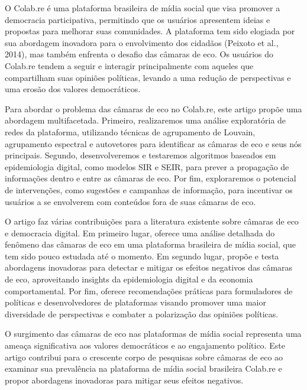 O Colab.re é uma plataforma brasileira de mídia social que visa promover a democracia participativa, permitindo que os usuários apresentem ideias e propostas para melhorar suas comunidades. A plataforma tem sido elogiada por sua abordagem inovadora para o envolvimento dos cidadãos (Peixoto et al., 2014), mas também enfrenta o desafio das câmaras de eco. Os usuários do Colab.re tendem a seguir e interagir principalmente com aqueles que compartilham suas opiniões políticas, levando a uma redução de perspectivas e uma erosão dos valores democráticos.

Para abordar o problema das câmaras de eco no Colab.re, este artigo propõe uma abordagem multifacetada. Primeiro, realizaremos uma análise exploratória de redes da plataforma, utilizando técnicas de agrupamento de Louvain, agrupamento espectral e autovetores para identificar as câmaras de eco e seus nós principais. Segundo, desenvolveremos e testaremos algoritmos baseados em epidemiologia digital, como modelos SIR e SEIR, para prever a propagação de informações dentro e entre as câmaras de eco. Por fim, exploraremos o potencial de intervenções, como sugestões e campanhas de informação, para incentivar os usuários a se envolverem com conteúdos fora de suas câmaras de eco.

O artigo faz várias contribuições para a literatura existente sobre câmaras de eco e democracia digital. Em primeiro lugar, oferece uma análise detalhada do fenômeno das câmaras de eco em uma plataforma brasileira de mídia social, que tem sido pouco estudada até o momento. Em segundo lugar, propõe e testa abordagens inovadoras para detectar e mitigar os efeitos negativos das câmaras de eco, aproveitando insights da epidemiologia digital e da economia comportamental. Por fim, oferece recomendações práticas para formuladores de políticas e desenvolvedores de plataformas visando promover uma maior diversidade de perspectivas e combater a polarização das opiniões políticas.

O surgimento das câmaras de eco nas plataformas de mídia social representa uma ameaça significativa aos valores democráticos e ao engajamento político. Este artigo contribui para o crescente corpo de pesquisas sobre câmaras de eco ao examinar sua prevalência na plataforma de mídia social brasileira Colab.re e propor abordagens inovadoras para mitigar seus efeitos negativos.